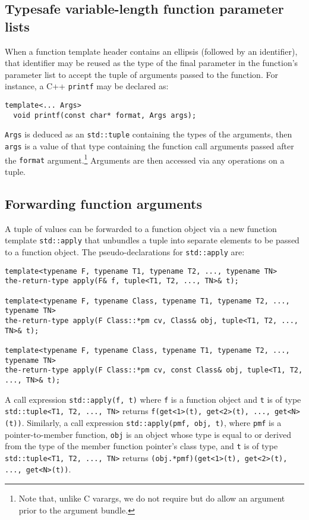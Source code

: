 \documentclass{article}
\begin{document}
\subsection{Typesafe variable-length function parameter lists}
When a function template header contains an ellipsis (followed by an
identifier), that identifier may be reused as the type of the final
parameter in the function's parameter list to accept the tuple of
arguments passed to the function. For instance, a C++ {\tt printf} may
be declared as:
\begin{verbatim}
template<... Args>
  void printf(const char* format, Args args);
\end{verbatim}

{\tt Args} is deduced as an {\tt std::tuple} containing the types of
the arguments, then {\tt args} is a value of that type containing the
function call arguments passed after the {\tt format}
argument.\footnote{Note that, unlike C varargs, we do not require but
  do allow an argument prior to the argument bundle.} Arguments are
then accessed via any operations on a tuple. 

\subsection{Forwarding function arguments}
A tuple of values can be forwarded to a function object via a new
function template {\tt std::apply} that unbundles a tuple into
separate elements to be passed to a function object. The
pseudo-declarations for {\tt std::apply} are:
\begin{verbatim}
template<typename F, typename T1, typename T2, ..., typename TN>
the-return-type apply(F& f, tuple<T1, T2, ..., TN>& t);

template<typename F, typename Class, typename T1, typename T2, ..., typename TN>
the-return-type apply(F Class::*pm cv, Class& obj, tuple<T1, T2, ..., TN>& t);

template<typename F, typename Class, typename T1, typename T2, ..., typename TN>
the-return-type apply(F Class::*pm cv, const Class& obj, tuple<T1, T2, ..., TN>& t);
\end{verbatim}
A call expression {\tt std::apply(f, t)} where {\tt f} is a function
object and {\tt t} is of type {\tt std::tuple<T1, T2, ..., TN>}
returns {\tt f(get<1>(t), get<2>(t), ..., get<N>(t))}. Similarly, a
call expression {\tt std::apply(pmf, obj, t)}, where {\tt pmf} is a
pointer-to-member function, {\tt obj} is an object whose type is equal
to or derived from the type of the member function pointer's class
type, and {\tt t} is of type {\tt std::tuple<T1, T2, ..., TN>} returns
{\tt (obj.*pmf)(get<1>(t), get<2>(t), ..., get<N>(t))}.
\end{document}
